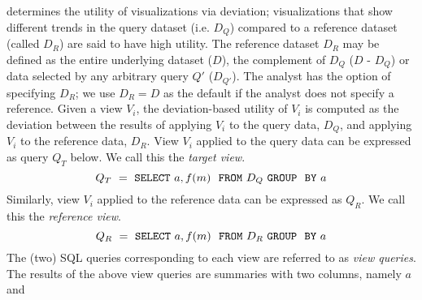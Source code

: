 \SeeDB determines the utility of 
visualizations via deviation; visualizations that show different trends in the query
dataset (i.e. $D_Q$) compared to a reference dataset (called $D_R$) are said to have high
utility.
The reference dataset $D_R$ may be defined as the entire underlying dataset ($D$),
the complement of $D_Q$ ($D$ - $D_Q$) or data selected by any arbitrary query $Q'$ ($D_{Q'}$).
The analyst has the option of specifying $D_R$; we use $D_R = D$ as the default if the analyst does not specify a reference. 
Given a view $V_i$, the deviation-based utility of $V_i$ is
computed as the deviation between the results of applying $V_i$ to the query data, $D_Q$,
and applying $V_i$ to the reference data, $D_R$.
View $V_i$ applied to the query data can be expressed as query 
$Q_T$ below. 
We call this the {\em target view}.
$$ Q_T\ =\ {\tt SELECT \ } a, f(m) \ \ {\tt FROM} \  D_Q\  {\tt GROUP \ \ BY} \ a$$ 
Similarly, view $V_i$ applied to the reference data can be expressed as $Q_R$. 
We call this the {\em reference view}. 
$$ Q_R\ =\ {\tt SELECT \ } a, f(m) \ \ {\tt FROM} \  D_R\  {\tt GROUP \ \ BY} \ a$$
The (two) SQL queries corresponding to each view are referred to as {\em view queries}.
The results of the above view queries are summaries with two columns, namely $a$ and
